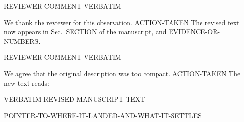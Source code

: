 %
%
%

\begin{reviewercomment}
{{REVIEWER-COMMENT-VERBATIM}}
\end{reviewercomment}

\begin{reviewerresponse}
We thank the reviewer for this observation. {{ACTION-TAKEN}} The revised text now appears in Sec.~{{SECTION}} of the manuscript, and {{EVIDENCE-OR-NUMBERS}}.
\end{reviewerresponse}

\begin{reviewercomment}
{{REVIEWER-COMMENT-VERBATIM}}
\end{reviewercomment}

\begin{reviewerresponse}
We agree that the original description was too compact. {{ACTION-TAKEN}} The new text reads:
\begin{changes}
{{VERBATIM-REVISED-MANUSCRIPT-TEXT}}
\end{changes}
{{POINTER-TO-WHERE-IT-LANDED-AND-WHAT-IT-SETTLES}}
\end{reviewerresponse}
